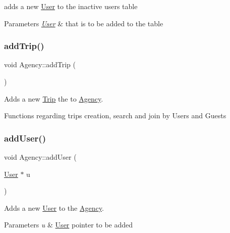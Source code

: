 adds a new \hyperlink{class_user}{User} to the inactive users table 


\begin{DoxyParams}{Parameters}
{\em \hyperlink{class_user}{User}} & that is to be added to the table \\
\hline
\end{DoxyParams}
\mbox{\label{class_agency_aa0c7d82673ce6b573ccc46da3289634c}} 
\subsubsection{\texorpdfstring{add\+Trip()}{addTrip()}}
{\footnotesize\ttfamily void Agency\+::add\+Trip (\begin{DoxyParamCaption}{ }\end{DoxyParamCaption})}



Adds a new \hyperlink{class_trip}{Trip} the to \hyperlink{class_agency}{Agency}. 

Functions regarding trips creation, search and join by Users and Guests \mbox{\label{class_agency_a9307d4ce4dd311f5744592248be6c9e5}} 
\subsubsection{\texorpdfstring{add\+User()}{addUser()}}
{\footnotesize\ttfamily void Agency\+::add\+User (\begin{DoxyParamCaption}\item[{\hyperlink{class_user}{User} $\ast$}]{u }\end{DoxyParamCaption})}



Adds a new \hyperlink{class_user}{User} to the \hyperlink{class_agency}{Agency}. 


\begin{DoxyParams}{Parameters}
{\em u} & \hyperlink{class_user}{User} pointer to be added \\
\hline
\end{DoxyParams}
\mbox{\label{class_agency_ab2a08b75fbe909173d539d27a06c7bc9}} 
